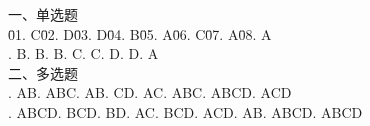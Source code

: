 \documentclass[a4paper]{article}
\begin{document}
\begin{tabbing}
一、单选题\\
\= 01. C\qquad \= 02. D\qquad \= 03. D\qquad \= 04. B\qquad \= 05. A\qquad \= 06. C\qquad \= 07. A\qquad \= 08. A\qquad \= \\
. B. B. B. C. C. D. D. A\\
二、多选题\\
. AB. ABC. AB. CD. AC. ABC. ABCD. ACD\\
. ABCD. BCD. BD. AC. BCD. ACD. AB. ABCD. ABCD\\
\end{tabbing}
\end{document}
